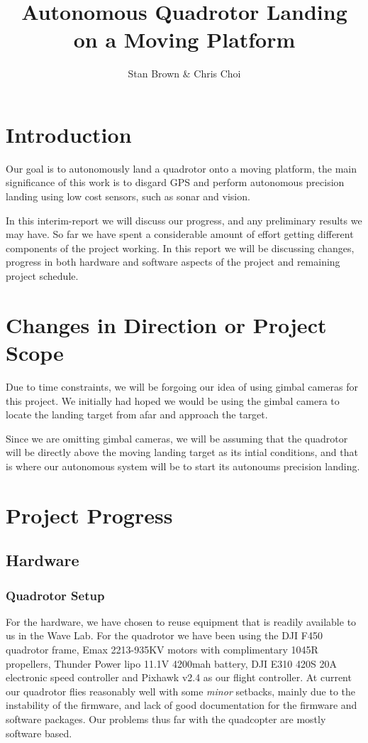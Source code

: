 \documentclass{article}[12pt]
\begin{document}
\title{Autonomous Quadrotor Landing on a Moving Platform}
\author{Stan Brown \& Chris Choi}
\date{}
\maketitle



\section*{Introduction}
Our goal is to autonomously land a quadrotor onto a moving platform, the main 
significance of this work is to disgard GPS and perform autonomous precision 
landing using low cost sensors, such as sonar and vision.

In this interim-report we will discuss our progress, and any preliminary 
results we may have. So far we have spent a considerable amount of effort 
getting different components of the project working. In this report we will be 
discussing changes, progress in both hardware and software aspects of the 
project and remaining project schedule.



\section*{Changes in Direction or Project Scope}

Due to time constraints, we will be forgoing our idea of using gimbal cameras 
for this project. We initially had hoped we would be using the gimbal camera 
to locate the landing target from afar and approach the target. 

Since we are omitting gimbal cameras, we will be assuming that the 
quadrotor will be directly above the moving landing target as its intial 
conditions, and that is where our autonomous system will be to start its 
autonoums precision landing.



\section*{Project Progress}
\subsection*{Hardware}
\subsubsection*{Quadrotor Setup}
For the hardware, we have chosen to reuse equipment that is readily available 
to us in the Wave Lab. For the quadrotor we have been using the DJI F450 
quadrotor frame, Emax 2213-935KV motors with complimentary 1045R propellers, 
Thunder Power lipo 11.1V 4200mah battery, DJI E310 420S 20A electronic speed 
controller and Pixhawk v2.4 as our flight controller. At current our quadrotor 
flies reasonably well with some \textit{minor} setbacks, mainly due to the 
instability of the firmware, and lack of good documentation for the firmware 
and software packages. Our problems thus far with the quadcopter are mostly 
software based.
\end{document}
